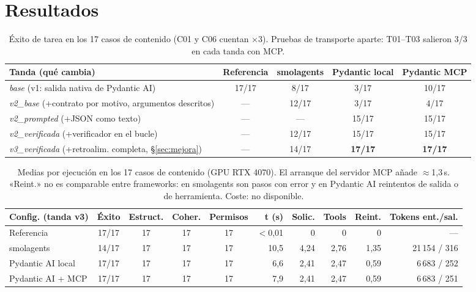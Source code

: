 \documentclass[10pt,a4paper]{article}
\begin{document}
\section{Resultados}\label{sec:res}
\begin{table}[h]\centering\scriptsize
\begin{tabular}{@{}lcccc@{}}\toprule
Tanda (qué cambia) & Referencia & smolagents & Pydantic local & Pydantic MCP\\\midrule
\emph{base} (v1: salida nativa de Pydantic AI) & 17/17 & 8/17 & 3/17 & 10/17\\
\emph{v2\_base} (+contrato por motivo, argumentos descritos) & --- & 12/17 & 3/17 & 4/17\\
\emph{v2\_prompted} (+JSON como texto) & --- & --- & 15/17 & 15/17\\
\emph{v2\_verificada} (+verificador en el bucle) & --- & 12/17 & 15/17 & 15/17\\
\emph{v3\_verificada} (+retroalim. completa, §\ref{sec:mejora}) & --- & 14/17 & \textbf{17/17} & \textbf{17/17}\\\bottomrule
\end{tabular}
\caption{Éxito de tarea en los 17 casos de contenido (C01 y C06 cuentan ×3). Pruebas de transporte aparte: T01--T03 salieron 3/3 en cada tanda con MCP.}\label{tab:tandas}
\end{table}
\begin{table}[h]\centering\footnotesize
\begin{tabular}{@{}lccccrrrrr@{}}\toprule
Config. (tanda v3) & Éxito & Estruct. & Coher. & Permisos & t (s) & Solic. & Tools & Reint. & Tokens ent./sal.\\\midrule
Referencia & 17/17 & 17 & 17 & 17 & $<$0,01 & 0 & 0 & 0 & ---\\
smolagents & 14/17 & 17 & 17 & 17 & 10,5 & 4,24 & 2,76 & 1,35 & 21\,154 / 316\\
Pydantic AI local & 17/17 & 17 & 17 & 17 & 6,6 & 2,41 & 2,47 & 0,59 & 6\,683 / 252\\
Pydantic AI + MCP & 17/17 & 17 & 17 & 17 & 7,9 & 2,41 & 2,47 & 0,59 & 6\,683 / 251\\\bottomrule
\end{tabular}
\caption{Medias por ejecución en los 17 casos de contenido (GPU RTX 4070). El arranque del servidor MCP añade $\approx$1,3\,s. «Reint.» no es comparable entre frameworks: en smolagents son pasos con error y en Pydantic AI reintentos de salida o de herramienta. Coste: no disponible.}\label{tab:final}
\end{table}
\end{document}
